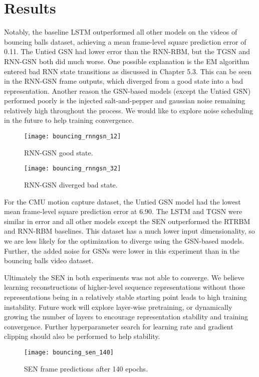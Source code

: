 \section{Results}
Notably, the baseline LSTM outperformed all other models on the videos of bouncing balls dataset, achieving a mean frame-level square prediction error of 0.11. The Untied GSN had lower error than the RNN-RBM, but the TGSN and RNN-GSN both did much worse. One possible explanation is the EM algorithm entered bad RNN state transitions as discussed in Chapter 5.3. This can be seen in the RNN-GSN frame outputs, which diverged from a good state into a bad representation. Another reason the GSN-based models (except the Untied GSN) performed poorly is the injected salt-and-pepper and gaussian noise remaining relatively high throughout the process. We would like to explore noise scheduling in the future to help training convergence.

\begin{figure}[h!]
  \centering
    \texttt{[image: bouncing\_rnngsn\_12]}
\caption{RNN-GSN good state.}
\end{figure}

\begin{figure}[h!]
  \centering
    \texttt{[image: bouncing\_rnngsn\_32]}
\caption{RNN-GSN diverged bad state.}
\end{figure}

For the CMU motion capture dataset, the Untied GSN model had the lowest mean frame-level square prediction error at 6.90. The LSTM and TGSN were similar in error and all other models except the SEN outperformed the RTRBM and RNN-RBM baselines. This dataset has a much lower input dimensionality, so we are less likely for the optimization to diverge using the GSN-based models. Further, the added noise for GSNs were lower in this experiment than in the bouncing balls video dataset.

Ultimately the SEN in both experiments was not able to converge. We believe learning reconstructions of higher-level sequence representations without those representations being in a relatively stable starting point leads to high training instability. Future work will explore layer-wise pretraining, or dynamically growing the number of layers to encourage representation stability and training convergence. Further hyperparameter search for learning rate and gradient clipping should also be performed to help stability.

\begin{figure}[h!]
  \centering
    \texttt{[image: bouncing\_sen\_140]}
\caption{SEN frame predictions after 140 epochs.}
\end{figure}

